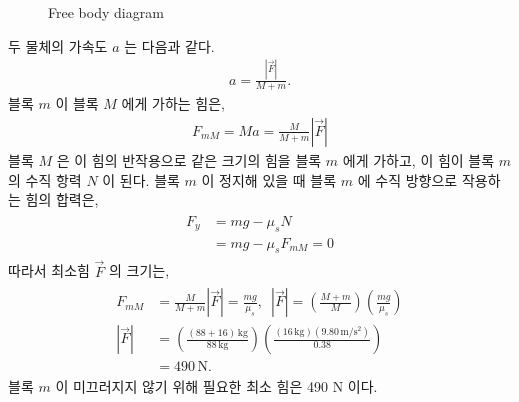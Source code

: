 \documentclass[floatfix,nofootinbib,superscriptaddress,fleqn,preprint]{revtex4}
\begin{document}

\begin{figure}
   \caption{Free body diagram}
\end{figure}

두 물체의 가속도 $a$ 는 다음과 같다.
\begin{align}
  a = \frac{|\vec{F}|}{M+m}.
\end{align}
 블록 $m$ 이 블록 $M$ 에게 가하는 힘은,
 \begin{align}
   F_{mM} = Ma = \frac{M}{M+m}|\vec{F}|
 \end{align} 
 블록 $M$ 은 이 힘의 반작용으로 같은 크기의 힘을 블록 $m$ 에게 가하고, 
 이 힘이 블록 $m$ 의 수직 항력 $N$ 이 된다. 블록 $m$ 이 정지해 있을 때 
 블록 $m$ 에 수직 방향으로 작용하는 힘의 합력은,
 \begin{align}
  \begin{split}
    F_y &= mg - \mu_sN \\
    &= mg - \mu_s F_{mM} = 0
  \end{split}
 \end{align}
 따라서 최소힘 $\vec{F}$ 의 크기는,
 \begin{align}
   \begin{split}
     F_{mM} &= \frac{M}{M+m}|\vec{F}| =\frac{mg}{\mu_s},\,\,\,
     |\vec{F}| = \left(\frac{M+m}{M}\right)\left(\frac{mg}{\mu_s}\right)  \\
     |\vec{F}| &= \left(\frac{(88+16)\,\mathrm{kg}}{88\,\mathrm{kg}}\right)
     \left(\frac{(16\,\mathrm{kg})(9.80\,\mathrm{m/s^2})}{0.38}\right)  \\
     &= 490\,\mathrm{N}.
   \end{split}
 \end{align}
 블록 $m$ 이 미끄러지지 않기 위해 필요한 최소 힘은 490 N 이다.
\end{document}
